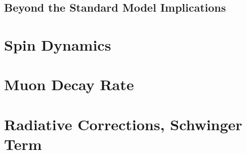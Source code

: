 \documentclass{outhesis}
\begin{document}
\section{Beyond the Standard Model Implications}
\label{fut}




\appendix
\setcounter{chapter}{0}  %
 \chapter{Spin Dynamics}
 \label{app:bmt}
 \chapter{Muon Decay Rate}
 \label{app:muon}
 \chapter{Radiative Corrections, Schwinger Term}
 \label{app:schwinger}


\end{document}
